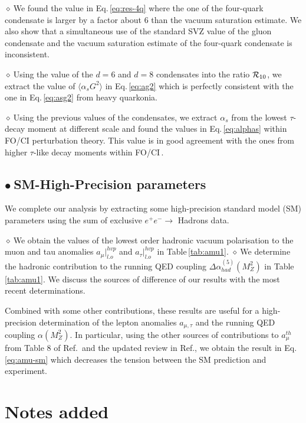 \documentclass[review]{elsarticle}
\def\la{\langle}
\def\ra{\rangle}
\def\b{$\bullet~$}
\def\d{$\diamond~$}
\begin{document}
\d  We found the value in Eq.\,\ref{eq:res-4q} where the one of the four-quark condensate is larger by a factor about 6 than the vacuum saturation estimate. We also show that a simultaneous use of the standard SVZ value of the gluon condensate and the vacuum saturation estimate of the four-quark condensate is inconsistent. 

\d Using the value of the $d=6$ and $d=8$ condensates into the ratio ${\cal R}_{10}$, we extract the value of $\la\alpha_s G^2\ra$ in Eq.\,\ref{eq:ag2} which is perfectly consistent with the one in Eq.\,\ref{eq:asg2} from heavy quarkonia. 


\d Using the previous values of the condensates, we extract $\alpha_s$ from the lowest $\tau$-decay moment at different scale and found the values in Eq.\,\ref{eq:alphas} within FO/CI perturbation theory. This value is in good agreement with the ones from higher $\tau$-like decay moments within FO/CI\,\cite{PICH2}. 

\subsection*{\b SM-High-Precision parameters}
We complete our analysis by extracting some high-precision standard model (SM) parameters using the sum of exclusive $e^+e^-\to$ Hadrons data.

\d We obtain the values of the lowest order hadronic vacuum polarisation to the muon and tau anomalies $a_\mu\vert^{hvp}_{l.o}$ and $a_\tau\vert^{hvp}_{l.o}$ in Table\,\ref{tab:amu1}. 
\d We determine the hadronic contribution  to the running QED coupling $ \Delta \alpha_{had}^{(5)} (M_Z^2)$ in Table\,\ref{tab:amu1}. We discuss the sources of difference of our results with the most recent determinations.

Combined with some other contributions, these results are useful for a high-precision determination of the lepton anomalies $a_{\mu,\tau}$ and the running QED coupling $\alpha(M_Z^2)$.  In particular, using  the other sources of contributions to $a_\mu^{th}$ from Table 8 of Ref.\,\cite{KNECHT} and the updated review in Ref.\cite{GM2}, we obtain the result in Eq.\,\ref{eq:amu-sm} which decreases the tension between the SM prediction and experiment.  

\section{Notes added}
\end{document}

